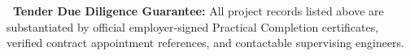 \vfill

\noindent
\begin{tcolorbox}[enhanced, colback=white, colframe=mhnavy, boxrule=0.8pt, arc=3pt, left=8pt, right=8pt, top=6pt, bottom=6pt, drop shadow=black!3]
    {\fontsize{7.8pt}{10.0pt}\selectfont\color{mhnavy}\bfseries\faCheckCircle\ Tender Due Diligence Guarantee:}\quad
    {\fontsize{7.6pt}{9.6pt}\selectfont\color{mhtext}
    All project records listed above are substantiated by official employer-signed Practical Completion certificates, verified contract appointment references, and contactable supervising engineers.
    }
\end{tcolorbox}

\clearpage
